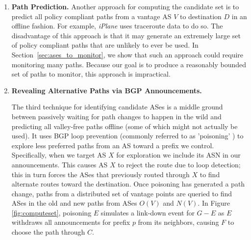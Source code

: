 \begin{enumerate}
\item \textbf{Path Prediction.} Another approach for 
computing the candidate set is to predict all 
policy compliant paths from a vantage AS $V$ to destination $D$
in an offline fashion. For example, \emph{iPlane} \cite{iplane} uses 
traceroute data to do so. The disadvantage of this approach 
is that it may generate an extremely large set of policy compliant 
paths that are unlikely to ever be used. In Section~\ref{sec:ases_to_monitor}, we show that such an approach could require monitoring many paths. Because our goal is to 
produce a reasonably bounded set of paths to monitor, this approach 
is impractical.

\item \textbf{Revealing Alternative Paths via BGP Announcements.} 

The third technique for identifying candidate ASes is a middle ground between
passively waiting for path changes to happen in the wild and predicting all 
valley-free paths offline (some of which might not actually be used). It uses
BGP loop prevention (commonly referred to as 'poisoning' \cite{optometry,lorenzo-thesis}) 
to explore less preferred paths from an AS toward a prefix we control.
Specifically, when we target AS $X$ for exploration we include its ASN in our 
announcements. This causes AS $X$ to reject the route due to loop detection; 
this in turn forces the ASes 
that previously routed through $X$ to find alternate routes toward the destination.
Once poisoning has generated a path change, paths from a distributed set of
vantage points are queried to find ASes in the old and new paths from ASes $O(V)$ 
and $N(V)$. In Figure \ref{fig:computeset}, poisoning $E$ simulates a link-down 
event for $G-E$ as $E$ withdraws all announcements for prefix $p$
from its neighbors, causing $F$ to choose the path through $C$.

\end{enumerate}


